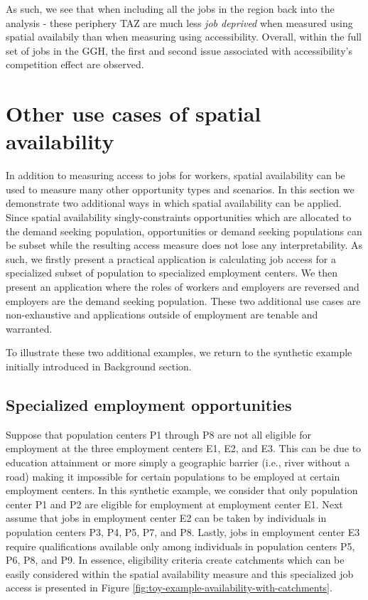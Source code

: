 \documentclass[]{elsarticle} %
\begin{document}
As such, we see that when including all the jobs in the region back into
the analysis - these periphery TAZ are much less \emph{job deprived}
when measured using spatial availabily than when measuring using
accessibility. Overall, within the full set of jobs in the GGH, the
first and second issue associated with accessibility's competition
effect are observed.

\hypertarget{other-use-cases-of-spatial-availability}{%
\section{Other use cases of spatial
availability}\label{other-use-cases-of-spatial-availability}}

In addition to measuring access to jobs for workers, spatial
availability can be used to measure many other opportunity types and
scenarios. In this section we demonstrate two additional ways in which
spatial availability can be applied. Since spatial availability
singly-constraints opportunities which are allocated to the demand
seeking population, opportunities or demand seeking populations can be
subset while the resulting access measure does not lose any
interpretability. As such, we firstly present a practical application is
calculating job access for a specialized subset of population to
specialized employment centers. We then present an application where the
roles of workers and employers are reversed and employers are the demand
seeking population. These two additional use cases are non-exhaustive
and applications outside of employment are tenable and warranted.

To illustrate these two additional examples, we return to the synthetic
example initially introduced in Background section.

\hypertarget{specialized-employment-opportunities}{%
\subsection{Specialized employment
opportunities}\label{specialized-employment-opportunities}}

Suppose that population centers P1 through P8 are not all eligible for
employment at the three employment centers E1, E2, and E3. This can be
due to education attainment or more simply a geographic barrier (i.e.,
river without a road) making it impossible for certain populations to be
employed at certain employment centers. In this synthetic example, we
consider that only population center P1 and P2 are eligible for
employment at employment center E1. Next assume that jobs in employment
center E2 can be taken by individuals in population centers P3, P4, P5,
P7, and P8. Lastly, jobs in employment center E3 require qualifications
available only among individuals in population centers P5, P6, P8, and
P9. In essence, eligibility criteria create catchments which can be
easily considered within the spatial availability measure and this
specialized job access is presented in Figure
\ref{fig:toy-example-availability-with-catchments}.
\end{document}
